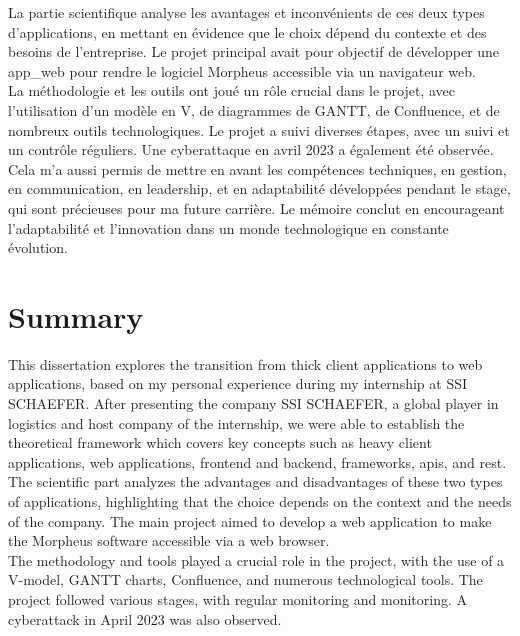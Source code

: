 \documentclass[a4paper, 12pt, french]{article}
\begin{document}
			La partie scientifique analyse les avantages et inconvénients de ces deux types d'applications, en mettant en évidence que le choix dépend du contexte et des besoins de l'entreprise. Le projet principal avait pour objectif de développer une \gls{app_web} pour rendre le logiciel Morpheus accessible via un navigateur web.\\

			La méthodologie et les outils ont joué un rôle crucial dans le projet, avec l'utilisation d'un modèle en V, de diagrammes de GANTT, de Confluence, et de nombreux outils technologiques. Le projet a suivi diverses étapes, avec un suivi et un contrôle réguliers. Une cyberattaque en avril 2023 a également été observée.\\

			Cela m'a aussi permis de mettre en avant les compétences techniques, en gestion, en communication, en leadership, et en adaptabilité développées pendant le stage, qui sont précieuses pour ma future carrière. Le mémoire conclut en encourageant l'adaptabilité et l'innovation dans un monde technologique en constante évolution.
		
		\section*{Summary}
			This dissertation explores the transition from thick client applications to web applications, based on my personal experience during my internship at SSI SCHAEFER. After presenting the company SSI SCHAEFER, a global player in logistics and host company of the internship, we were able to establish the theoretical \gls{framework} which covers key concepts such as heavy client applications, web applications, \gls{frontend} and \gls{backend}, \glspl{framework}, \acrshort{api}s, and \acrshort{rest}.\\

			The scientific part analyzes the advantages and disadvantages of these two types of applications, highlighting that the choice depends on the context and the needs of the company. The main project aimed to develop a web application to make the Morpheus software accessible via a web browser.\\

			The methodology and tools played a crucial role in the project, with the use of a V-model, GANTT charts, Confluence, and numerous technological tools. The project followed various stages, with regular monitoring and monitoring. A cyberattack in April 2023 was also observed.\\
\end{document}
